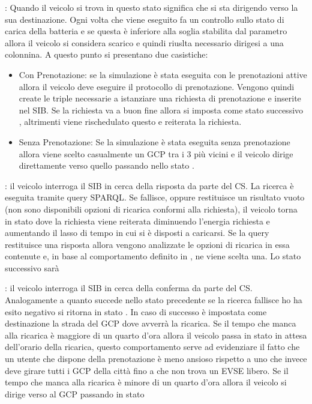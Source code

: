 \begin{description}
	\item \label{state:driving} : Quando il veicolo si trova in questo stato significa che si sta dirigendo verso la sua destinazione. Ogni volta che viene eseguito fa un controllo sullo stato di carica della batteria e se questa è inferiore alla soglia stabilita dal parametro  allora il veicolo si considera scarico e quindi riuslta necessario dirigesi a una colonnina. A questo punto si presentano due casistiche:
	\begin{itemize}
		\item{Con Prenotazione}: se la simulazione è stata eseguita con le prenotazioni attive allora il veicolo deve eseguire il protocollo di prenotazione. Vengono quindi create le triple necessarie a istanziare una richiesta di prenotazione e inserite nel SIB. Se la richiesta va a buon fine allora si imposta come stato successivo , altrimenti viene rischedulato questo e reiterata la richiesta.
		\item{Senza Prenotazione}: Se la simulazione è stata eseguita senza prenotazione allora viene scelto casualmente un GCP tra i 3 più vicini e il veicolo dirige direttamente verso quello passando nello stato .
	\end{itemize}
	\item {}: il veicolo interroga il SIB in cerca della risposta da parte del CS. La ricerca è eseguita tramite query SPARQL. Se fallisce, oppure restituisce un risultato vuoto (non sono disponibili opzioni di ricarica conformi alla richiesta), il veicolo torna in stato  dove la richiesta viene reiterata diminuendo l'energia richiesta e aumentando il lasso di tempo in cui si è disposti a caricarsi. Se la query restituisce una risposta allora vengono analizzate le opzioni di ricarica in essa contenute e, in base al comportamento definito in , ne viene scelta una. Lo stato successivo sarà  
	\item {}: il veicolo interroga il SIB in cerca della conferma da parte del CS. Analogamente a quanto succede nello stato precedente se la ricerca fallisce ho ha esito negativo si ritorna in stato . In caso di successo è impostata come destinazione la strada del GCP dove avverrà la ricarica. Se il tempo che manca alla ricarica è maggiore di un quarto d'ora allora il veicolo passa in stato  in attesa dell'orario della ricarica, questo comportamento serve ad evidenziare il fatto che un utente che dispone della prenotazione è meno ansioso rispetto a uno che invece deve girare tutti i GCP della città fino a che non trova un EVSE libero. Se il tempo che manca alla ricarica è minore di un quarto d'ora allora il veicolo si dirige verso al GCP passando in stato 

\end{description}
